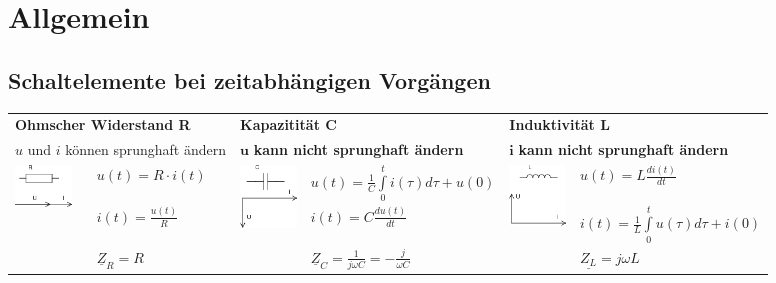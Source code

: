 
\section{Allgemein}
	\subsection{Schaltelemente bei zeitabhängigen Vorgängen}
	   		\begin{tabular}{p{1.5cm} p{4.3cm} |p{1.5cm} p{4.3cm}| p{1.5cm} p{4.3cm}}
	   	   		\multicolumn{2}{l}{\textbf{Ohmscher Widerstand R}}
	   	   			& \multicolumn{2}{l}{\textbf{Kapazitität C}}
	   	   			& \multicolumn{2}{l}{\textbf{Induktivität L}} \\
	   	   		\multicolumn{2}{l}{$u$ und $i$ können sprunghaft ändern}
	   	   			& \multicolumn{2}{l}{$\mathbf{u}$ \textbf{kann nicht sprunghaft ändern}}
	   	   			& \multicolumn{2}{l}{$\mathbf{i}$ \textbf{kann nicht sprunghaft ändern}} \\
	   	   	
	   	   		\multirow{2}{1.5cm}{
	   				\includegraphics[width=1.5cm]{./bilder/zeigerdiag-r.png}}
	   				& $u(t) = R \cdot i(t)$ 
	   				& \multirow{2}{1.5cm}{\includegraphics[width=1.5cm]{./bilder/zeigerdiag-c.png}}
	   				& $u(t) = \frac{1}{C} \int\limits_0^t i(\tau) d\tau + u(0)$
	   				& 
	   				\multirow{2}{1.5cm}{\includegraphics[width=1.5cm]{./bilder/zeigerdiag-l.png}}
	   				&$u(t) = L \frac{di(t)}{dt}$\\
	   				
	   				&$i(t) = \frac{u(t)}{R}$
	   				& & $i(t) = C \frac{d u(t)}{dt}$
	   				& & $i(t) = \frac{1}{L} \int\limits_0^t u(\tau) d\tau + i(0)$\\
	   				
	   				& $\underline{Z}_R = R$
	   				& & $\underline{Z}_C = \frac{1}{j \omega C} = - \frac{j}{\omega C}$
	   				& & $\underline{Z_L} = j \omega L$\\
	   	   	\end{tabular}
	   	

